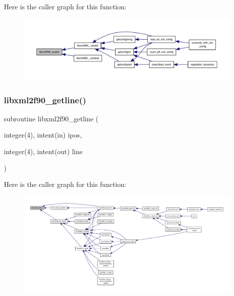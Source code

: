Here is the caller graph for this function\+:
\nopagebreak
\begin{figure}[H]
\begin{center}
\leavevmode
\includegraphics[width=350pt]{libxml2f90_8f90__pp_8f90_aedaeb0ba8d5ce41c39baed261d3f82c5_icgraph}
\end{center}
\end{figure}
\mbox{\label{libxml2f90_8f90__pp_8f90_abef5a4be7710d60ad11aab5a59fe5325}} 
\subsubsection{\texorpdfstring{libxml2f90\+\_\+getline()}{libxml2f90\_getline()}}
{\footnotesize\ttfamily subroutine libxml2f90\+\_\+getline (\begin{DoxyParamCaption}\item[{integer(4), intent(in)}]{ipos,  }\item[{integer(4), intent(out)}]{line }\end{DoxyParamCaption})}

Here is the caller graph for this function\+:
\nopagebreak
\begin{figure}[H]
\begin{center}
\leavevmode
\includegraphics[width=350pt]{libxml2f90_8f90__pp_8f90_abef5a4be7710d60ad11aab5a59fe5325_icgraph}
\end{center}
\end{figure}
\mbox{\label{libxml2f90_8f90__pp_8f90_a9ba5ab680800c28b4f9d6ceb0e8aa3f4}} 
